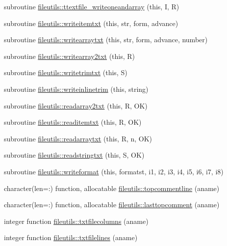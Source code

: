 \begin{DoxyCompactItemize}
\item 
subroutine \mbox{\hyperlink{namespacefileutils_a8673cc2b2bcfe0639966d2789c1bbade}{fileutils\+::ttextfile\+\_\+writeoneandarray}} (this, I, R)
\item 
subroutine \mbox{\hyperlink{namespacefileutils_ab3c52d3927403448ae70cbb4596db4af}{fileutils\+::writeitemtxt}} (this, str, form, advance)
\item 
subroutine \mbox{\hyperlink{namespacefileutils_a94187e504a2d61ed06c891f18cab95e4}{fileutils\+::writearraytxt}} (this, str, form, advance, number)
\item 
subroutine \mbox{\hyperlink{namespacefileutils_a35a5634d3290863e76dddffcf9ac63e2}{fileutils\+::writearray2txt}} (this, R)
\item 
subroutine \mbox{\hyperlink{namespacefileutils_a1b72d4facdf945b9ab5d8cf747100c96}{fileutils\+::writetrimtxt}} (this, S)
\item 
subroutine \mbox{\hyperlink{namespacefileutils_a01a3ab096e4a99267bda3254c773e55b}{fileutils\+::writeinlinetrim}} (this, string)
\item 
subroutine \mbox{\hyperlink{namespacefileutils_a1917cefee39a500fd5987b5165c97d8a}{fileutils\+::readarray2txt}} (this, R, OK)
\item 
subroutine \mbox{\hyperlink{namespacefileutils_a66242f0b2d2b3f96d182f76f5e616c7d}{fileutils\+::readitemtxt}} (this, R, OK)
\item 
subroutine \mbox{\hyperlink{namespacefileutils_a580904418c96464193ec145fd077c14b}{fileutils\+::readarraytxt}} (this, R, n, OK)
\item 
subroutine \mbox{\hyperlink{namespacefileutils_ade8cd999a137d0402f901977ef1441c0}{fileutils\+::readstringtxt}} (this, S, OK)
\item 
subroutine \mbox{\hyperlink{namespacefileutils_a0c8c6f2ca823e9e6d8a31d4002347730}{fileutils\+::writeformat}} (this, formatst, i1, i2, i3, i4, i5, i6, i7, i8)
\item 
character(len=\+:) function, allocatable \mbox{\hyperlink{namespacefileutils_ae11b16645a03a608941045fd5b9d2d8a}{fileutils\+::topcommentline}} (aname)
\item 
character(len=\+:) function, allocatable \mbox{\hyperlink{namespacefileutils_ae232e4522b4ac06686734f7d1d457d21}{fileutils\+::lasttopcomment}} (aname)
\item 
integer function \mbox{\hyperlink{namespacefileutils_aef4950c08afd7c3cd6edffdb879a81f3}{fileutils\+::txtfilecolumns}} (aname)
\item 
integer function \mbox{\hyperlink{namespacefileutils_a2b9938e7b58f8d85091546603d9e8f08}{fileutils\+::txtfilelines}} (aname)

\end{DoxyCompactItemize}
